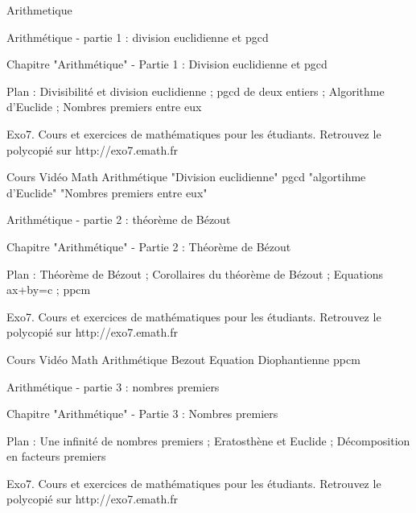 
   Arithmetique

Arithmétique - partie 1 : division euclidienne et pgcd



Chapitre "Arithmétique" - Partie 1 : Division euclidienne et pgcd

Plan : Divisibilité et division euclidienne ; pgcd de deux entiers ; 
Algorithme d'Euclide ; Nombres premiers entre eux

Exo7. Cours et exercices de mathématiques pour les étudiants.
Retrouvez le polycopié sur http://exo7.emath.fr


Cours Vidéo Math Arithmétique "Division euclidienne" pgcd "algortihme d'Euclide" "Nombres premiers entre eux"





Arithmétique - partie 2 : théorème de Bézout



Chapitre "Arithmétique" - Partie 2 : Théorème de Bézout 

Plan : Théorème de Bézout ; Corollaires du théorème de Bézout ;
Equations ax+by=c ; ppcm

Exo7. Cours et exercices de mathématiques pour les étudiants.
Retrouvez le polycopié sur http://exo7.emath.fr


Cours Vidéo Math Arithmétique Bezout Equation Diophantienne ppcm





Arithmétique - partie 3 : nombres premiers



Chapitre "Arithmétique" - Partie 3 : Nombres premiers

Plan : Une infinité de nombres premiers ; Eratosthène et Euclide ;
Décomposition en facteurs premiers

Exo7. Cours et exercices de mathématiques pour les étudiants.
Retrouvez le polycopié sur http://exo7.emath.fr


